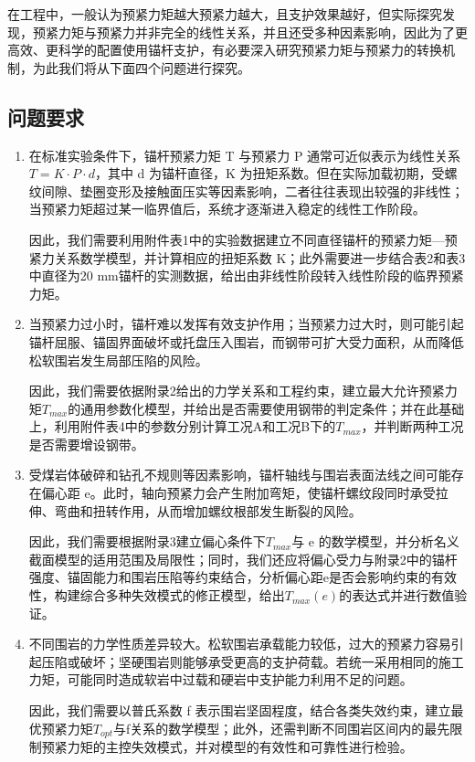 \documentclass[UTF-8,a4paper,zihao=-4]{ctexart}
\begin{document}
在工程中，一般认为预紧力矩越大预紧力越大，且支护效果越好，但实际探究发现，预紧力矩与预紧力并非完全的线性关系，并且还受多种因素影响，因此为了更高效、更科学的配置使用锚杆支护，有必要深入研究预紧力矩与预紧力的转换机制，为此我们将从下面四个问题进行探究。
\subsection{问题要求}
\begin{enumerate}
    \item 在标准实验条件下，锚杆预紧力矩 T 与预紧力 P 通常可近似表示为线性关系$T=K\cdot P\cdot d$，其中 d 为锚杆直径，K 为扭矩系数。但在实际加载初期，受螺纹间隙、垫圈变形及接触面压实等因素影响，二者往往表现出较强的非线性；当预紧力矩超过某一临界值后，系统才逐渐进入稳定的线性工作阶段。

    因此，我们需要利用附件表1中的实验数据建立不同直径锚杆的预紧力矩—预紧力关系数学模型，并计算相应的扭矩系数 K；此外需要进一步结合表2和表3中直径为20 mm锚杆的实测数据，给出由非线性阶段转入线性阶段的临界预紧力矩。
    
    \item 当预紧力过小时，锚杆难以发挥有效支护作用；当预紧力过大时，则可能引起锚杆屈服、锚固界面破坏或托盘压入围岩，而钢带可扩大受力面积，从而降低松软围岩发生局部压陷的风险。
    
    因此，我们需要依据附录2给出的力学关系和工程约束，建立最大允许预紧力矩$T_{max}$的通用参数化模型，并给出是否需要使用钢带的判定条件；并在此基础上，利用附件表4中的参数分别计算工况A和工况B下的$T_{max}$，并判断两种工况是否需要增设钢带。
    
    \item 受煤岩体破碎和钻孔不规则等因素影响，锚杆轴线与围岩表面法线之间可能存在偏心距 e。此时，轴向预紧力会产生附加弯矩，使锚杆螺纹段同时承受拉伸、弯曲和扭转作用，从而增加螺纹根部发生断裂的风险。
    
    因此，我们需要根据附录3建立偏心条件下$T_{max}$与 e 的数学模型，并分析名义截面模型的适用范围及局限性；同时，我们还应将偏心受力与附录2中的锚杆强度、锚固能力和围岩压陷等约束结合，分析偏心距e是否会影响约束的有效性，构建综合多种失效模式的修正模型，给出$T_{max}(e)$的表达式并进行数值验证。
    
    \item 不同围岩的力学性质差异较大。松软围岩承载能力较低，过大的预紧力容易引起压陷或破坏；坚硬围岩则能够承受更高的支护荷载。若统一采用相同的施工力矩，可能同时造成软岩中过载和硬岩中支护能力利用不足的问题。
    
    因此，我们需要以普氏系数 f 表示围岩坚固程度，结合各类失效约束，建立最优预紧力矩$T_{opt}$与f关系的数学模型；此外，还需判断不同围岩区间内的最先限制预紧力矩的主控失效模式，并对模型的有效性和可靠性进行检验。
    
\end{enumerate}
\end{document}

